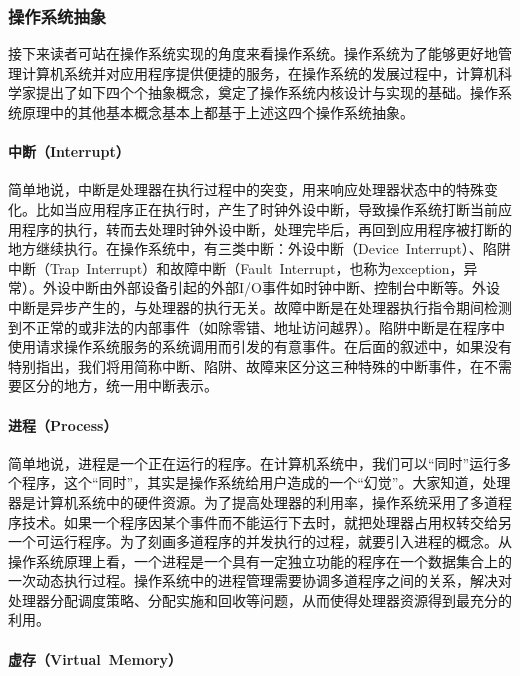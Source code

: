 \subsubsection{操作系统抽象}

接下来读者可站在操作系统实现的角度来看操作系统。操作系统为了能够更好地管理计算机系统并对应用程序提供便捷的服务，在操作系统的发展过程中，计算机科学家提出了如下四个个抽象概念，奠定了操作系统内核设计与实现的基础。操作系统原理中的其他基本概念基本上都基于上述这四个操作系统抽象。

\paragraph{中断（Interrupt）}

简单地说，中断是处理器在执行过程中的突变，用来响应处理器状态中的特殊变化。比如当应用程序正在执行时，产生了时钟外设中断，导致操作系统打断当前应用程序的执行，转而去处理时钟外设中断，处理完毕后，再回到应用程序被打断的地方继续执行。在操作系统中，有三类中断：外设中断（Device Interrupt）、陷阱中断（Trap Interrupt）和故障中断（Fault Interrupt，也称为exception，异常）。外设中断由外部设备引起的外部I/O事件如时钟中断、控制台中断等。外设中断是异步产生的，与处理器的执行无关。故障中断是在处理器执行指令期间检测到不正常的或非法的内部事件（如除零错、地址访问越界）。陷阱中断是在程序中使用请求操作系统服务的系统调用而引发的有意事件。在后面的叙述中，如果没有特别指出，我们将用简称中断、陷阱、故障来区分这三种特殊的中断事件，在不需要区分的地方，统一用中断表示。

\paragraph{进程（Process）}

简单地说，进程是一个正在运行的程序。在计算机系统中，我们可以“同时”运行多个程序，这个“同时”，其实是操作系统给用户造成的一个“幻觉”。大家知道，处理器是计算机系统中的硬件资源。为了提高处理器的利用率，操作系统采用了多道程序技术。如果一个程序因某个事件而不能运行下去时，就把处理器占用权转交给另一个可运行程序。为了刻画多道程序的并发执行的过程，就要引入进程的概念。从操作系统原理上看，一个进程是一个具有一定独立功能的程序在一个数据集合上的一次动态执行过程。操作系统中的进程管理需要协调多道程序之间的关系，解决对处理器分配调度策略、分配实施和回收等问题，从而使得处理器资源得到最充分的利用。

\paragraph{虚存（Virtual Memory）}

